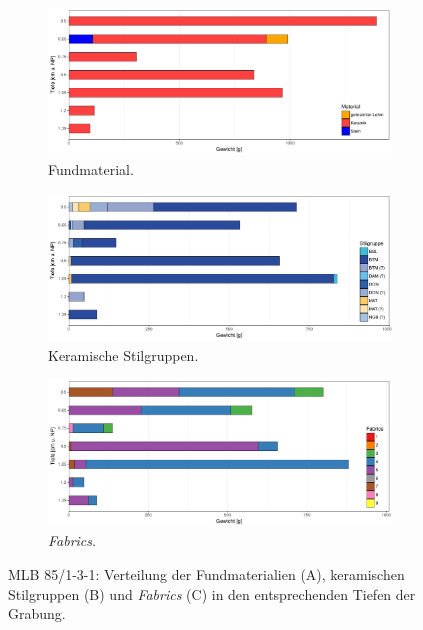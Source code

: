 \begin{figure}[p]
	\centering
	\begin{subfigure}[t]{\textwidth}
		\centering
		\includegraphics[width=\textwidth]{fig/9-1_MLB85-131_VerteilungFunde_R.pdf}
		\caption{Fundmaterial.\vspace{1em}}
		\label{fig:MLB85-1_VerteilungFunde}
	\end{subfigure}
	\begin{subfigure}[t]{\textwidth}
		\centering
		\includegraphics[width=\textwidth]{fig/9-1_MLB85-131_KeramikStilgruppen_R.pdf}
		\caption{Keramische Stilgruppen.\vspace{1em}}
		\label{fig:MLB85-1_KeramikStilgruppen}
	\end{subfigure}
	\begin{subfigure}[t]{\textwidth}
		\centering
		\includegraphics[width=\textwidth]{fig/9-1_MLB85-131_Fabrics_R.pdf}
		\caption{\textit{Fabrics}.}
		\label{fig:MLB85-1_VerteilungFabrics}
	\end{subfigure}
	\caption{MLB 85/1-3-1: Verteilung der Fundmaterialien (A), keramischen Stilgruppen (B) und \textit{Fabrics} (C) in den entsprechenden Tiefen der Grabung.}
	\label{fig:MLB85-1_Verteilung}
\end{figure}

